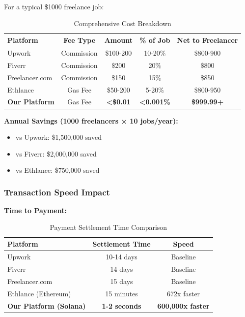 \documentclass[a4paper,13pt,twoside]{report}
\theoremstyle{definition}
\begin{document}
For a typical \$1000 freelance job:

\begin{table}[h]
\centering
\caption{Comprehensive Cost Breakdown}
\begin{tabular}{|l|c|c|c|c|}
\hline
\textbf{Platform} & \textbf{Fee Type} & \textbf{Amount} & \textbf{\% of Job} & \textbf{Net to Freelancer} \\
\hline
Upwork & Commission & \$100-200 & 10-20\% & \$800-900 \\
Fiverr & Commission & \$200 & 20\% & \$800 \\
Freelancer.com & Commission & \$150 & 15\% & \$850 \\
Ethlance & Gas Fee & \$50-200 & 5-20\% & \$800-950 \\
\textbf{Our Platform} & Gas Fee & \textbf{<\$0.01} & \textbf{<0.001\%} & \textbf{\$999.99+} \\
\hline
\end{tabular}
\end{table}

\textbf{Annual Savings (1000 freelancers × 10 jobs/year):}
\begin{itemize}
    \item vs Upwork: \$1,500,000 saved
    \item vs Fiverr: \$2,000,000 saved
    \item vs Ethlance: \$750,000 saved
\end{itemize}

\subsubsection{Transaction Speed Impact}

\textbf{Time to Payment:}
\begin{table}[h]
\centering
\caption{Payment Settlement Time Comparison}
\begin{tabular}{|l|c|c|}
\hline
\textbf{Platform} & \textbf{Settlement Time} & \textbf{Speed} \\
\hline
Upwork & 10-14 days & Baseline \\
Fiverr & 14 days & Baseline \\
Freelancer.com & 15 days & Baseline \\
Ethlance (Ethereum) & 15 minutes & 672x faster \\
\textbf{Our Platform (Solana)} & \textbf{1-2 seconds} & \textbf{600,000x faster} \\
\hline
\end{tabular}
\end{table}
\end{document}
